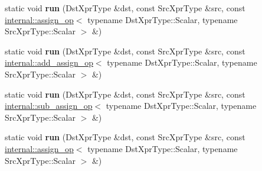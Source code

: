 \begin{DoxyCompactItemize}
\item 
\mbox{\label{struct_eigen_1_1internal_1_1_assignment_3_01_dst_xpr_type_00_01_src_xpr_type_00_01_functor_00_01_diagonal2_dense_01_4_ad33964548f8f2981e5d35e2d2e8fffe8}} 
static void {\bfseries run} (Dst\+Xpr\+Type \&dst, const Src\+Xpr\+Type \&src, const \hyperlink{struct_eigen_1_1internal_1_1assign__op}{internal\+::assign\+\_\+op}$<$ typename Dst\+Xpr\+Type\+::\+Scalar, typename Src\+Xpr\+Type\+::\+Scalar $>$ \&)
\item 
\mbox{\label{struct_eigen_1_1internal_1_1_assignment_3_01_dst_xpr_type_00_01_src_xpr_type_00_01_functor_00_01_diagonal2_dense_01_4_a4267da91867006719a3767e13c44098c}} 
static void {\bfseries run} (Dst\+Xpr\+Type \&dst, const Src\+Xpr\+Type \&src, const \hyperlink{struct_eigen_1_1internal_1_1add__assign__op}{internal\+::add\+\_\+assign\+\_\+op}$<$ typename Dst\+Xpr\+Type\+::\+Scalar, typename Src\+Xpr\+Type\+::\+Scalar $>$ \&)
\item 
\mbox{\label{struct_eigen_1_1internal_1_1_assignment_3_01_dst_xpr_type_00_01_src_xpr_type_00_01_functor_00_01_diagonal2_dense_01_4_a08f8787f00a2ea39eea1e0d2d64cb2a4}} 
static void {\bfseries run} (Dst\+Xpr\+Type \&dst, const Src\+Xpr\+Type \&src, const \hyperlink{struct_eigen_1_1internal_1_1sub__assign__op}{internal\+::sub\+\_\+assign\+\_\+op}$<$ typename Dst\+Xpr\+Type\+::\+Scalar, typename Src\+Xpr\+Type\+::\+Scalar $>$ \&)
\item 
\mbox{\label{struct_eigen_1_1internal_1_1_assignment_3_01_dst_xpr_type_00_01_src_xpr_type_00_01_functor_00_01_diagonal2_dense_01_4_ad33964548f8f2981e5d35e2d2e8fffe8}} 
static void {\bfseries run} (Dst\+Xpr\+Type \&dst, const Src\+Xpr\+Type \&src, const \hyperlink{struct_eigen_1_1internal_1_1assign__op}{internal\+::assign\+\_\+op}$<$ typename Dst\+Xpr\+Type\+::\+Scalar, typename Src\+Xpr\+Type\+::\+Scalar $>$ \&)

\end{DoxyCompactItemize}
